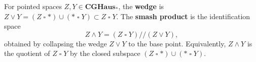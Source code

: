 For pointed spaces $Z, Y \in \mathbf{CGHaus}_*$, the \textbf{wedge} is $Z \vee Y = (Z \mathbin{\square} *) \cup (* \mathbin{\square} Y) \subset Z \mathbin{\square} Y$. The \textbf{smash product} is the identification space
$$Z \wedge Y = (Z \mathbin{\square} Y) /\!/ (Z \vee Y),$$
obtained by collapsing the wedge $Z \vee Y$ to the base point. Equivalently, $Z \wedge Y$ is the quotient of $Z \mathbin{\square} Y$ by the closed subspace $(Z \mathbin{\square} *) \cup (* \mathbin{\square} Y)$.
